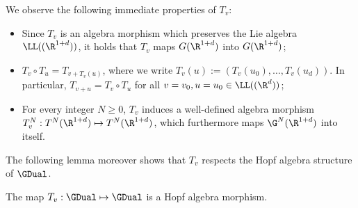 \documentclass{article}
\begin{document}

We observe the following immediate properties of $T_v$:

\begin{itemize}
\item Since $T_v$ is an algebra morphism which preserves the Lie algebra $\LL((\R^{1+d}))$, it holds that $T_v$ maps $G(\R^{1+d})$ into $G(\R^{1+d})$;


\item $T_v \circ T_u = T_{v + T_v(u)}$, where we write $T_v(u) := (T_v(u_0),\ldots, T_v(u_d))$. In particular, $T_{v+u} = T_v \circ T_u$ for all $v = v_0,u = u_0 \in \LL((\R^{d}))$;

\item For every integer $N \geq 0$, $T_v$ induces a well-defined algebra morphism $T^N_v : T^N(\R^{1+d}) \mapsto T^N(\R^{1+d})$, which furthermore maps $\G^N(\R^{1+d})$ into itself.
\end{itemize}

The following lemma moreover shows that $T_v$ respects the Hopf algebra structure of $\GDual$.

\begin{lemma}\label{lem:HopfMorph}
The map $T_v : \GDual \mapsto \GDual$ is a Hopf algebra morphism. 
\end{lemma}
\end{document}
